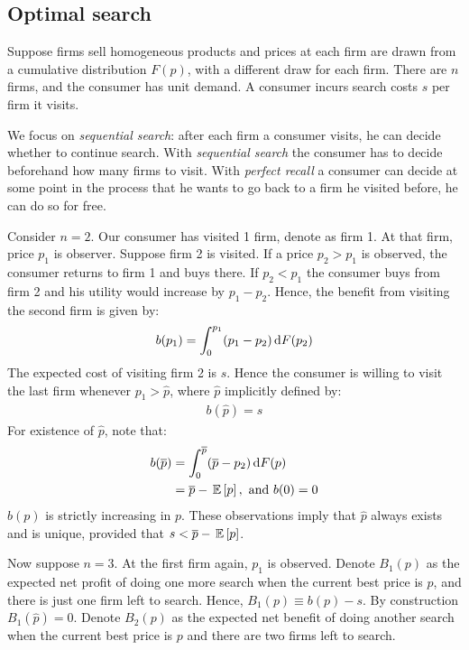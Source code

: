 \subsection{Optimal search}
Suppose firms sell homogeneous products and prices at each firm are drawn
from a cumulative distribution $F(p)$, with a different draw for each
firm. There are $n$ firms, and the consumer has unit demand. A consumer
incurs search costs $s$ per firm it visits.

We focus on \textit{sequential search}: after each firm a consumer visits,
he can decide whether to continue search. With \textit{sequential search}
the consumer has to decide beforehand how many firms to visit. With
\textit{perfect recall} a consumer can decide at some point in the process
that he wants to go back to a firm he visited before, he can do so for free.

Consider $n=2$. Our consumer has visited 1 firm, denote as firm 1. At that
firm, price $p_1$ is observer. Suppose firm 2 is visited. If a price
$p_2>p_1$ is observed, the consumer returns to firm 1 and buys there.
If $p_2<p_1$ the consumer buys from firm 2 and his utility would increase by
$p_1-p_2$. Hence, the benefit from visiting the second firm is given by:
\begin{align}
	b(p_1)=\int_0^{p_1}(p_1-p_2)\,\textrm{d}F(p_2)
\end{align}
The expected cost of visiting firm 2 is $s$. Hence the consumer is willing
to visit the last firm whenever $p_1>\hat{p}$, where $\hat p$ implicitly
defined by:
\begin{align}
	b(\hat p)=s
\end{align}
For existence of $\hat p$, note that:
\begin{align}
	b(\overline p) & =\int_0^{\overline p}(\overline p-p_2)\,\textrm{d}F(p) \\
	               & = \overline p -\,\mathbb{E}\left[p\right],\text{ and }b(0)=0
\end{align}
$b(p)$ is strictly increasing in $p$. These observations imply that $\hat p$
always exists and is unique, provided that $s<\overline p-\,\mathbb{E}\left[p\right]$.

Now suppose $n=3$. At the first firm again, $p_1$ is observed. Denote
$B_1(p)$ as the expected net profit of doing one more search when the
current best price is $p$, and there is just one firm left to search.
Hence, $B_1(p)\equiv b(p)-s$. By construction $B_1(\hat p)=0$. Denote
$B_2(p)$ as the expected net benefit of doing another search when the
current best price is $p$ and there are two firms left to search.

